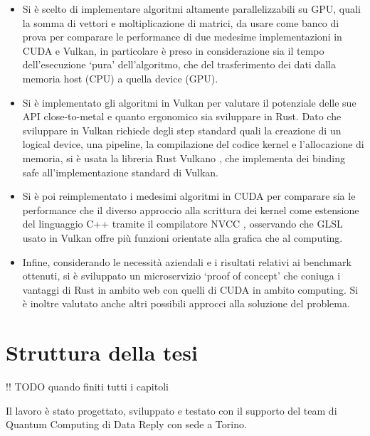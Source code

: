 \begin{itemize}
    \item Si è scelto di implementare algoritmi altamente parallelizzabili su GPU, quali la somma di vettori e moltiplicazione di matrici, da usare come banco di prova per comparare le performance di due medesime implementazioni in CUDA e Vulkan, in particolare è preso in considerazione sia il tempo dell'esecuzione `pura' dell'algoritmo, che del trasferimento dei dati dalla memoria host (CPU) a quella device (GPU).
    \item Si è implementato gli algoritmi in Vulkan per valutare il potenziale delle sue API close-to-metal e quanto ergonomico sia sviluppare in Rust. Dato che sviluppare in Vulkan richiede degli step standard quali la creazione di un logical device, una pipeline, la compilazione del codice kernel e l'allocazione di memoria, si è usata la libreria Rust Vulkano \cite[]{Rust:Vulkano}, che implementa dei binding safe all'implementazione standard di Vulkan.
    \item Si è poi reimplementato i medesimi algoritmi in CUDA per comparare sia le performance che il diverso approccio alla scrittura dei kernel come estensione del linguaggio C++ tramite il compilatore \gls{NVCC} \cite[]{NVIDIA:nvcc}, osservando che GLSL \cite[]{KG:GLSL} usato in Vulkan offre più funzioni orientate alla grafica che al computing.
    \item Infine, considerando le necessità aziendali e i risultati relativi ai benchmark ottenuti, si è sviluppato un microservizio `proof of concept' che coniuga i vantaggi di Rust in ambito web con quelli di CUDA in ambito computing. Si è inoltre valutato anche altri possibili approcci alla soluzione del problema.
\end{itemize}



\section[Struttura della tesi]{Struttura della tesi}

!! TODO quando finiti tutti i capitoli

Il lavoro è stato progettato, sviluppato e testato con il supporto del team di Quantum Computing di Data Reply con sede a Torino. 

